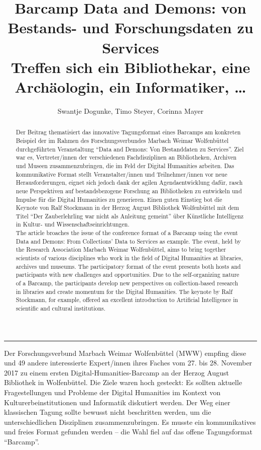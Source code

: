 \documentclass[a4paper,
fontsize=11pt,
oneside,
numbers=noperiodatend,
parskip=half-,
bibliography=totoc,
final
]{scrartcl}
\title{\LARGE{Barcamp Data and Demons: von Bestands- und Forschungsdaten zu Services \\
Treffen sich ein Bibliothekar, eine Archäologin, ein Informatiker, …}} %
\author{Swantje Dogunke, Timo Steyer, Corinna Mayer} %
\date{}
\begin{document}
\maketitle
\thispagestyle{fancyplain} 

\begin{abstract}
Der Beitrag thematisiert das innovative Tagungsformat eines Barcamps am
konkreten Beispiel der im Rahmen des Forschungsverbundes Marbach Weimar
Wolfenbüttel durchgeführten Veranstaltung ``Data and Demons: Von
Bestanddaten zu Services''. Ziel war es, Vertreter/innen der
verschiedenen Fachdisziplinen an Bibliotheken, Archiven und Museen
zusammenzubringen, die im Feld der Digital Humanities arbeiten. Das
kommunikative Format stellt Veranstalter/innen und Teilnehmer/innen vor
neue Herausforderungen, eignet sich jedoch dank der agilen
Agendaentwicklung dafür, rasch neue Perspektiven auf bestandsbezogene
Forschung an Bibliotheken zu entwickeln und Impulse für die Digital
Humanities zu generieren. Einen guten Einstieg bot die Keynote von Ralf
Stockmann in der Herzog August Bibliothek Wolfenbüttel mit dem Titel
``Der Zauberlehrling war nicht als Anleitung gemeint'' über Künstliche
Intelligenz in Kultur- und Wissenschaftseinrichtungen.\\

The article broaches the issue of the conference format of a Barcamp
using the event Data and Demons: From Collections' Data to Services as
example. The event, held by the Research Association Marbach Weimar
Wolfenbüttel, aims to bring together scientists of various disciplines
who work in the field of Digital Humanities at libraries, archives und
museums. The participatory format of the event presents both hosts and
participants with new challenges and opportunities. Due to the
self-organizing nature of a Barcamp, the participants develop new
perspectives on collection-based research in libraries and create
momentum for the Digital Humanities. The keynote by Ralf Stockmann, for
example, offered an excellent introduction to Artificial Intelligence in
scientific and cultural institutions.
\end{abstract}

\begin{center}\rule{0.5\linewidth}{\linethickness}\end{center}

Der Forschungsverbund Marbach Weimar Wolfenbüttel (MWW) empfing diese
und 49 andere interessierte Expert/innen ihres Faches vom 27. bis 28.
November 2017 zu einem ersten Digital-Humanities-Barcamp an der Herzog
August Bibliothek in Wolfenbüttel. Die Ziele waren hoch gesteckt: Es
sollten aktuelle Fragestellungen und Probleme der Digital Humanities im
Kontext von Kulturerbeinstitutionen und Informatik diskutiert werden.
Der Weg einer klassischen Tagung sollte bewusst nicht beschritten
werden, um die unterschiedlichen Disziplinen zusammenzubringen. Es
musste ein kommunikatives und freies Format gefunden werden -- die Wahl
fiel auf das offene Tagungsformat \enquote{Barcamp}.
\end{document}
